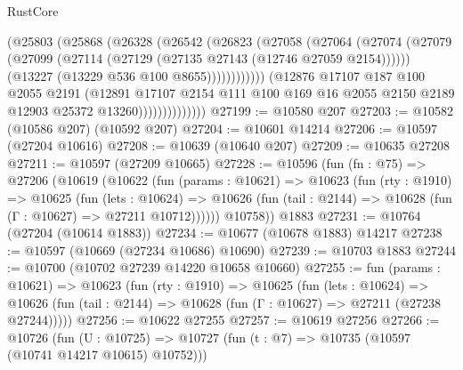 \begin{lexlean}{RustCore}
\begin{coremodule}
                                (@25803
                                  (@25868
                                    (@26328
                                      (@26542
                                        (@26823
                                          (@27058
                                            (@27064
                                              (@27074
                                                (@27079
                                                  (@27099
                                                    (@27114
                                                      (@27129
                                                        (@27135 @27143 (@12746 @27059 @2154))))))
                                                (@13227 (@13229 @536 @100 @8655))))))))))))
                            (@12876
                              @17107
                              @187
                              @100
                              @2055
                              @2191
                              (@12891
                                @17107
                                @2154
                                @111
                                @100
                                @169
                                @16
                                @2055
                                @2150
                                @2189
                                @12903
                                @25372
                                @13260))))))))))))))
@27199 := @10580 @207
@27203 := @10582 (@10586 @207) (@10592 @207)
@27204 := @10601 @14214
@27206 := @10597 (@27204 @10616)
@27208 := @10639 (@10640 @207)
@27209 := @10635 @27208
@27211 := @10597 (@27209 @10665)
@27228 := @10596
    (fun (fn : @75) =>
    @27206
      (@10619
        (@10622
          (fun (params : @10621) =>
          @10623
            (fun (rty : @1910) =>
            @10625
              (fun (lets : @10624) =>
              @10626 (fun (tail : @2144) => @10628 (fun (Γ : @10627) => @27211 @10712))))))
        @10758))
    @1883
@27231 := @10764 (@27204 (@10614 @1883))
@27234 := @10677 (@10678 @1883) @14217
@27238 := @10597 (@10669 (@27234 @10686) @10690)
@27239 := @10703 @1883
@27244 := @10700 (@10702 @27239 @14220 @10658 @10660)
@27255 := fun (params : @10621) =>
  @10623
    (fun (rty : @1910) =>
    @10625
      (fun (lets : @10624) =>
      @10626 (fun (tail : @2144) => @10628 (fun (Γ : @10627) => @27211 (@27238 @27244)))))
@27256 := @10622 @27255
@27257 := @10619 @27256
@27266 := @10726
    (fun (U : @10725) => @10727 (fun (t : @7) => @10735 (@10597 (@10741 @14217 @10615) @10752)))

\end{coremodule}
\end{lexlean}
